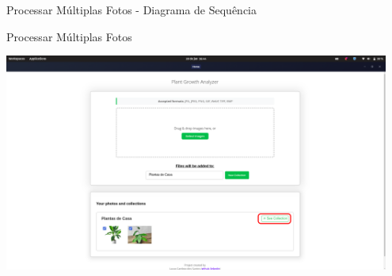 \documentclass[landscape, 12pt]{beamer}
\begin{document}
\begin{frame}{Processar Múltiplas Fotos - Diagrama de Sequência}
    \begin{center}
    \end{center}
\end{frame}

\begin{frame}{Processar Múltiplas Fotos}
    \begin{center}
        \includegraphics[width=0.95\textwidth]{../figures/screens/uc012/Screenshot from 2025-06-28 16-44-12.png}
    \end{center}
\end{frame}
\end{document}
